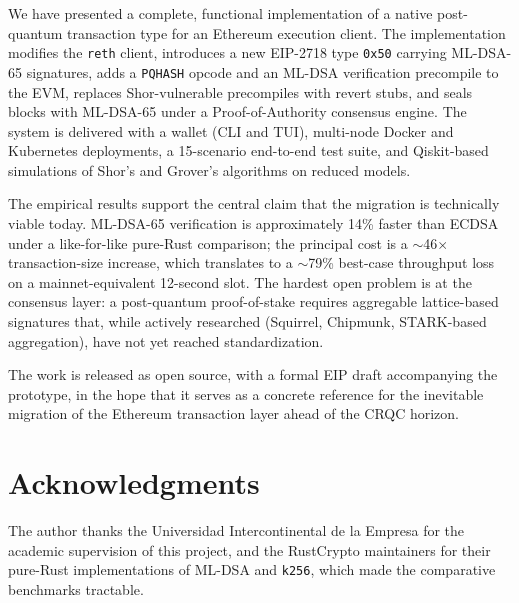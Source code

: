 \documentclass[journal,onecolumn,11pt]{IEEEtran}
\begin{document}
We have presented a complete, functional implementation of a native post-quantum transaction type for an Ethereum execution client. The implementation modifies the \texttt{reth} client, introduces a new EIP-2718 type \texttt{0x50} carrying ML-DSA-65 signatures, adds a \texttt{PQHASH} opcode and an ML-DSA verification precompile to the EVM, replaces Shor-vulnerable precompiles with revert stubs, and seals blocks with ML-DSA-65 under a Proof-of-Authority consensus engine. The system is delivered with a wallet (CLI and TUI), multi-node Docker and Kubernetes deployments, a 15-scenario end-to-end test suite, and Qiskit-based simulations of Shor's and Grover's algorithms on reduced models.

The empirical results support the central claim that the migration is technically viable today. ML-DSA-65 verification is approximately 14\% faster than ECDSA under a like-for-like pure-Rust comparison; the principal cost is a $\sim$46$\times$ transaction-size increase, which translates to a $\sim$79\% best-case throughput loss on a mainnet-equivalent 12-second slot. The hardest open problem is at the consensus layer: a post-quantum proof-of-stake requires aggregable lattice-based signatures that, while actively researched (Squirrel, Chipmunk, STARK-based aggregation), have not yet reached standardization.

The work is released as open source, with a formal EIP draft accompanying the prototype, in the hope that it serves as a concrete reference for the inevitable migration of the Ethereum transaction layer ahead of the CRQC horizon.

\section*{Acknowledgments}

The author thanks the Universidad Intercontinental de la Empresa for the academic supervision of this project, and the RustCrypto maintainers for their pure-Rust implementations of ML-DSA and \texttt{k256}, which made the comparative benchmarks tractable.



\end{document}
